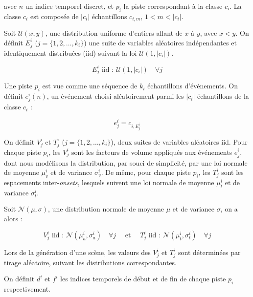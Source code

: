   avec $n$ un indice temporel discret, et $p_i$ la piste correspondant à la classe $c_i$. La classe $c_i$ est composée de $\vert c_i\vert$ échantillons $c_{i,m}$, $1<m<\vert c_i\vert$.

  Soit $\mathcal{U}(x,y)$, une distribution uniforme d'entiers allant de $x$ à $y$, avec $x<y$. On définit $E_j^i$ ($j=\lbrace 1,2,\ldots,k_i\rbrace$) une suite de variables aléatoires indépendantes et identiquement distribuées (iid) suivant la loi $\mathcal{U}(1,\vert c_i \vert)$.

  \begin{equation}
  E_j^i \textrm{ iid : } \mathcal{U}(1,\vert c_i \vert) \quad \forall j
  \end{equation}

  Une piste $p_i$ est vue comme une séquence de $k_i$ échantillons d'événements. On définit $e_j^i(n)$, un événement choisi aléatoirement parmi les $\vert c_i\vert$ échantillons de la classe $c_i$ :

  \begin{equation}
  e_j^i=c_{i,E_j^i}
  \end{equation}

  On définit $V^i_j$ et $T^i_j$ ($j=\lbrace 1,2,\ldots,k_i\rbrace$), deux suites de variables aléatoires iid. Pour chaque piste $p_i$, les $V^i_j$ sont les facteurs de volume appliqués aux événements $e_j^i$, dont nous modélisons la distribution, par souci de simplicité, par une loi normale de moyenne $\mu_v^i$ et de variance $\sigma_v^i$. De même, pour chaque piste $p_i$, les $T_j^i$ sont les espacements inter-\emph{onsets}, lesquels suivent une loi normale de moyenne $\mu_t^i$ et de variance $\sigma_t^i$.

  Soit $\mathcal{N}(\mu,\sigma)$, une distribution normale de moyenne $\mu$ et de variance $\sigma$, on a alors :

  \begin{equation}
  \label{eq:ch4_eq1}
  V_j^i \textrm{ iid : } \mathcal{N}(\mu_a^{i},\sigma_a^{i}) \quad \forall j \quad \textrm{ et } \quad T_j^i \textrm{ iid : } \mathcal{N}({\mu_t^{i},\sigma_t^{i}}) \quad \forall j
  \end{equation}

  Lors de la génération d'une scène, les valeurs des $V^i_j$ et $T_j^i$ sont déterminées par tirage aléatoire, suivant les distributions correspondantes.

  On définit $d^i$ et $f^i$ les indices temporels de début et de fin de chaque piste $p_i$ respectivement.

